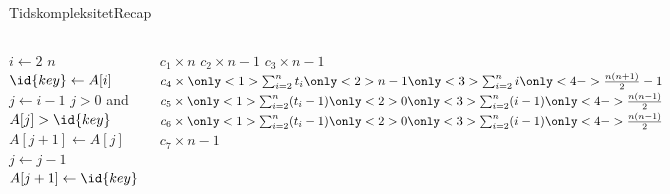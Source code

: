 \documentclass[aspectratio=1610]{beamer}
\begin{document}
\begin{frame}{Tidskompleksitet}{Recap}
    \begin{description}
    \end{description}

    \begin{columns}
        \begin{codebox}
            \li \For $i \gets 2$ \To $n$ \Do
                \li $\id{key} \gets A[i]$
                \li $j \gets i - 1$
                \li \While $j > 0$ and $A[j] > \id{key}$ \Do
                    \li $A[j+1] \gets A[j]$
                    \li $j \gets j - 1$
                \End
                \li $A[j+1] \gets \id{key}$
            \End
        \end{codebox}
        
        \begin{codebox}
            \zi $c_1 \times n$
            \zi $c_2 \times n - 1$
            \zi $c_3 \times n - 1$
            \zi $c_4 \times \only<1>{\sum^{n}_{i=2}t_i}
                    \only<2>{n-1}
                    \only<3>{\sum^{n}_{i=2}i}
                    \only<4->{\frac{n(n+1)}{2}-1}$
            \zi $c_5 \times \only<1>{\sum^{n}_{i=2}(t_i-1)}
                    \only<2>{0}
                    \only<3>{\sum^{n}_{i=2}(i-1)}
                    \only<4->{\frac{n(n-1)}{2}}$
            \zi $c_6 \times \only<1>{\sum^{n}_{i=2}(t_i-1)}
                    \only<2>{0}
                    \only<3>{\sum^{n}_{i=2}(i-1)}
                    \only<4->{\frac{n(n-1)}{2}}$
            \zi $c_7 \times n - 1$
        \end{codebox}
    \end{columns}

\end{frame}
\end{document}
